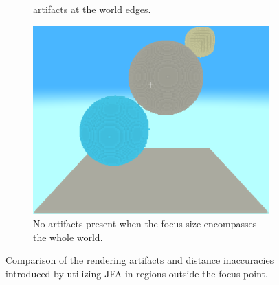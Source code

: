 \begin{figure}[htbp]
\begin{subfigure}[t]{0.32\textwidth}
{            artifacts at the world edges.}
    \end{subfigure}
    \hfill
    \begin{subfigure}[t]{0.32\textwidth}
        \centering
        \includegraphics[width=\textwidth]{figures/hybrid_focus_3.png}
        \caption{No artifacts present when the focus size encompasses the whole world.}
    \end{subfigure}
    \caption{Comparison of the rendering artifacts and distance inaccuracies introduced by utilizing JFA in regions
        outside the focus point.}
\end{figure}

